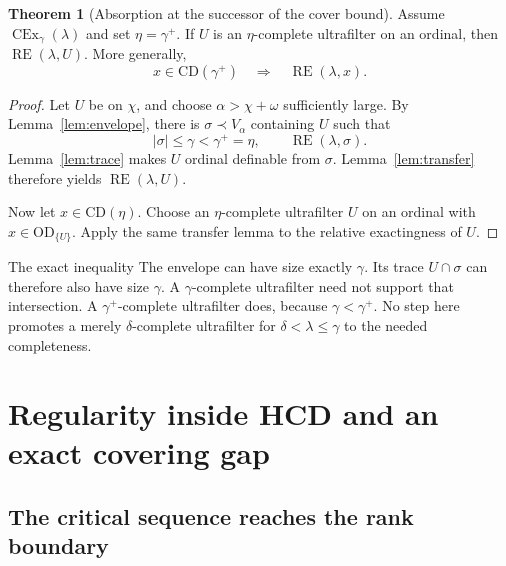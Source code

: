 \documentclass[11pt,letterpaper]{article}
\theoremstyle{definition}
\newtheorem{theorem}[definition]{Theorem}
\newcommand{\OD}{\mathrm{OD}}
\newcommand{\CEx}{\operatorname{CEx}}
\newcommand{\CD}{\mathrm{CD}}
\newcommand{\RE}{\operatorname{RE}}
\begin{document}
\begin{theorem}[Absorption at the successor of the cover bound]\label{thm:absorption}
Assume $\CEx_\gamma(\lambda)$ and set $\eta=\gamma^+$. If $U$ is an $\eta$-complete ultrafilter on an ordinal, then $\RE(\lambda,U)$. More generally,
\begin{equation}\label{eq:absorb-cd}
x\in\CD(\gamma^+)\quad\Longrightarrow\quad\RE(\lambda,x).
\end{equation}
\end{theorem}
\begin{proof}
Let $U$ be on $\chi$, and choose $\alpha>\chi+\omega$ sufficiently large. By Lemma~\ref{lem:envelope}, there is $\sigma\prec V_\alpha$ containing $U$ such that
\[
|\sigma|\le\gamma<\gamma^+=\eta,
\qquad\RE(\lambda,\sigma).
\]
Lemma~\ref{lem:trace} makes $U$ ordinal definable from $\sigma$. Lemma~\ref{lem:transfer} therefore yields $\RE(\lambda,U)$.

Now let $x\in\CD(\eta)$. Choose an $\eta$-complete ultrafilter $U$ on an ordinal with $x\in\OD_{\{U\}}$. Apply the same transfer lemma to the relative exactingness of $U$.
\end{proof}

\begin{assessment}{The exact inequality}
The envelope can have size exactly $\gamma$. Its trace $U\cap\sigma$ can therefore also have size $\gamma$. A $\gamma$-complete ultrafilter need not support that intersection. A $\gamma^+$-complete ultrafilter does, because $\gamma<\gamma^+$. No step here promotes a merely $\delta$-complete ultrafilter for $\delta<\lambda\le\gamma$ to the needed completeness.
\end{assessment}

\section{Regularity inside HCD and an exact covering gap}\label{sec:regularity}

\subsection{The critical sequence reaches the rank boundary}
\end{document}

